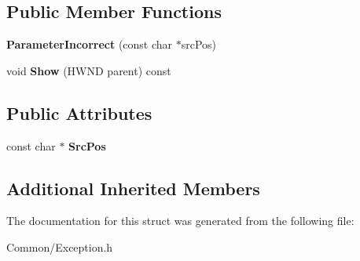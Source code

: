 \subsection*{Public Member Functions}
\begin{DoxyCompactItemize}
\item 
\mbox{\label{struct_gost_crypt_1_1_parameter_incorrect_a396b9551c08e69eeab671066d101734e}} 
{\bfseries Parameter\+Incorrect} (const char $\ast$src\+Pos)
\item 
\mbox{\label{struct_gost_crypt_1_1_parameter_incorrect_accf1af4f25b55a78e67a060b7158f5e6}} 
void {\bfseries Show} (H\+W\+ND parent) const
\end{DoxyCompactItemize}
\subsection*{Public Attributes}
\begin{DoxyCompactItemize}
\item 
\mbox{\label{struct_gost_crypt_1_1_parameter_incorrect_a36674aef49038331cf58af0fc6d45246}} 
const char $\ast$ {\bfseries Src\+Pos}
\end{DoxyCompactItemize}
\subsection*{Additional Inherited Members}


The documentation for this struct was generated from the following file\+:\begin{DoxyCompactItemize}
\item 
Common/Exception.\+h\end{DoxyCompactItemize}
